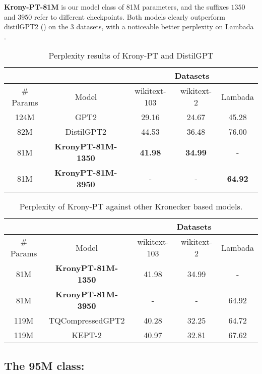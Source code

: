 \documentclass{article}
\begin{document}
{\textbf{Krony-PT-81M} is our model class of 81M parameters, and the suffixes $1350$ and $3950$ refer to different checkpoints. Both models clearly outperform distilGPT2 (\cite{sanh2019distilbert}) on the 3 datasets, with a noticeable better perplexity on Lambada \cite{paperno2016lambada}.


\begin{table}[h]
\centering
\begin{tabular}{|c|c|c|c|c|}
\hline
 & & \multicolumn{3}{c|}{Datasets} \\ \hline
\# Params &  Model            & wikitext-103 & wikitext-2 & Lambada \\ \hline
124M      & GPT2              & 29.16        & 24.67      & 45.28      \\ \hline
82M       & DistilGPT2        & 44.53        & 36.48      & 76.00      \\ \hline
81M       & \textbf{KronyPT-81M-1350}  & \textbf{41.98}   & \textbf{34.99}      & -          \\ \hline
81M       & \textbf{KronyPT-81M-3950}  & -            	  & -          & \textbf{64.92}      \\ \hline
\end{tabular}
\caption{Perplexity results of Krony-PT and DistilGPT}
\end{table}


\begin{table}[h]
\centering
\begin{tabular}{|c|c|c|c|c|}
\hline
 & & \multicolumn{3}{c|}{Datasets} \\ \hline
\# Params &  Model            & wikitext-103 & wikitext-2 & Lambada \\ \hline
81M       & \textbf{KronyPT-81M-1350}  & 41.98        & 34.99      & -          \\ \hline
81M       & \textbf{KronyPT-81M-3950}  & -            & -          & 64.92      \\ \hline
119M       & TQCompressedGPT2  & 40.28        & 32.25      & 64.72      \\ \hline
119M       & KEPT-2   & 40.97        & 32.81      & 67.62      \\ \hline
\end{tabular}
\caption{Perplexity of Krony-PT against other Kronecker based models.}
\end{table}

\subsection{The 95M class:}%
\label{sub:The 95M class:}

}
\end{document}
